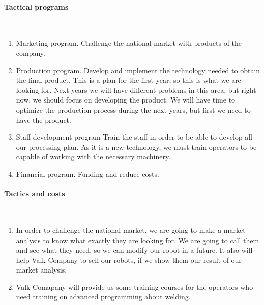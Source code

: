 \paragraph*{Tactical programs}~\\

\begin{enumerate}
\item Marketing program.
      Challenge the national market with products of the company.
\item Production program.
	Develop and implement the technology needed to obtain the final product.
	This is a plan for the first year, so this is what we are looking for. 
	Next years we will have different problems in this area, but right now, we should focus on developing the product. 
	We will have time to optimize the production process during the next years, but first we need to have the product.
\item Staff development program
	Train the staff in order to be able to develop all our processing plan.
	As it is a new technology, we must train operators to be capable of working with the necessary machinery.
\item Financial program.
      Funding and reduce costs.	
\end{enumerate}


\paragraph*{Tactics and costs}~\\
\begin{enumerate}
\item In order to challenge the national market, we are going to make a market analysis to know what exactly they are looking for. We are going to call them and see what they need, so we can modify our robot in a future. It also will help Valk Company to sell our robots, if we show them our result of our market analysis.
\item Valk Comapany will provide us some training courses for the operators who need training on advanced programming about welding.  
\end{enumerate}
